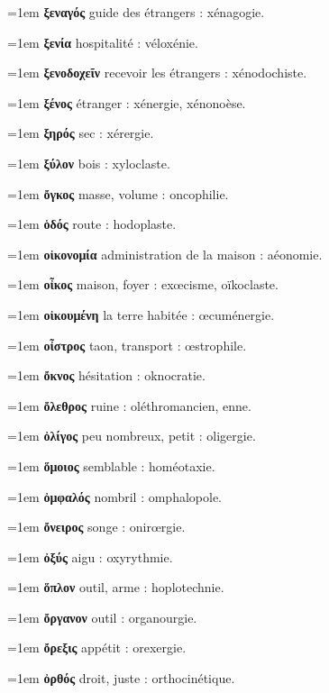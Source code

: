 \hangindent=1em \textbf{ξεναγός} guide des étrangers : xénagogie.\par
\hangindent=1em \textbf{ξενία} hospitalité : véloxénie.\par
\hangindent=1em \textbf{ξενοδοχεῖν} recevoir les étrangers : xénodochiste.\par
\hangindent=1em \textbf{ξένος} étranger : xénergie, xénonoèse.\par
\hangindent=1em \textbf{ξηρός} sec : xérergie.\par
\hangindent=1em \textbf{ξύλον} bois : xyloclaste.\par
\hangindent=1em \textbf{ὄγκος} masse, volume : oncophilie.\par
\hangindent=1em \textbf{ὁδός} route : hodoplaste.\par
\hangindent=1em \textbf{οἰκονομία} administration de la maison : aéonomie.\par
\hangindent=1em \textbf{οἶκος} maison, foyer : exœcisme, oïkoclaste.\par
\hangindent=1em \textbf{οἰκουμένη} la terre habitée : œcuménergie.\par
\hangindent=1em \textbf{οἶστρος} taon, transport : œstrophile.\par
\hangindent=1em \textbf{ὄκνος} hésitation : oknocratie.\par
\hangindent=1em \textbf{ὄλεθρος} ruine : oléthromancien, enne.\par
\hangindent=1em \textbf{ὀλίγος} peu nombreux, petit : oligergie.\par
\hangindent=1em \textbf{ὅμοιος} semblable : homéotaxie.\par
\hangindent=1em \textbf{ὀμφαλός} nombril : omphalopole.\par
\hangindent=1em \textbf{ὄνειρος} songe : onirœrgie.\par
\hangindent=1em \textbf{ὀξύς} aigu : oxyrythmie.\par
\hangindent=1em \textbf{ὅπλον} outil, arme : hoplotechnie.\par
\hangindent=1em \textbf{ὄργανον} outil : organourgie.\par
\hangindent=1em \textbf{ὄρεξις} appétit : orexergie.\par
\hangindent=1em \textbf{ὀρθός} droit, juste : orthocinétique.\par
